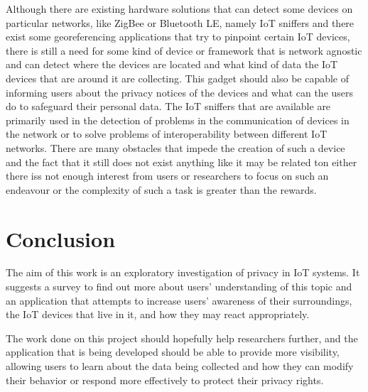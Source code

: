 \documentclass[manuscript,natbib=false]{acmart}
\begin{document}
Although there are existing hardware solutions that can detect some devices
on particular networks, like ZigBee or Bluetooth LE, namely IoT sniffers
and there exist some georeferencing applications that try to pinpoint certain
IoT devices, there is still a need for some kind of device or framework
that is network agnostic and can detect where the devices are located and
what kind of data the IoT devices that are around it are collecting. This
gadget should also be capable of informing users about the privacy notices
of the devices and what can the users do to safeguard their personal data.
The IoT sniffers that are available are primarily used in the detection
of problems in the communication of devices in the network or to solve problems
of interoperability between different IoT networks. There are many obstacles
that impede the creation of such a device and the fact that it still does
not exist anything like it may be related ton either there iss not enough
interest from users or researchers to focus on such an endeavour or the
complexity of such a task is greater than the rewards.

\section{Conclusion}

The aim of this work is an exploratory investigation of privacy in IoT systems.
It suggests a survey to find out more about users' understanding of
this topic and an application that attempts to increase users' awareness of
their surroundings, the IoT devices that live in it, and how they may react
appropriately.

The work done on this project should hopefully help researchers further, and the
application that is being developed should be able to provide more visibility,
allowing users to learn about the data being collected and how they can
modify their behavior or respond more effectively to protect their privacy rights.


\printbibliography

\end{document}
